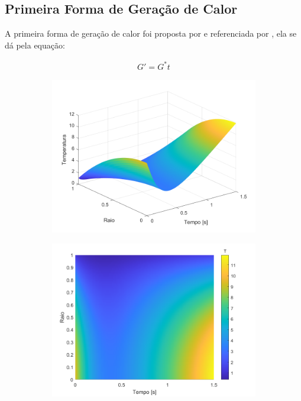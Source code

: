 \subsection{Primeira Forma de Geração de Calor}

A primeira forma de geração de calor foi proposta por \citet{bhattacharya2001} e referenciada por \citet{soares2017}, ela se dá pela equação:

\begin{gather}
    G ' = G ^* t
    \label{eq:first_form_of_heat}
\end{gather}

\begin{figure}[H]
    \centering
    \caption{Perfis de temperatura para primeira forma de geração de calor: (a) perspectiva isométrica; (b) vista superior.}
    
    \begin{subfigure}{0.45\textwidth}
        \includegraphics[width=1\linewidth]{figures/results/Fig01.png} 
        \caption{}
    \end{subfigure}
    \begin{subfigure}{0.45\textwidth}
        \includegraphics[width=1\linewidth]{figures/results/Fig02.png}
        \caption{}
    \end{subfigure}
    
    \label{fig:surface01}
\end{figure}

